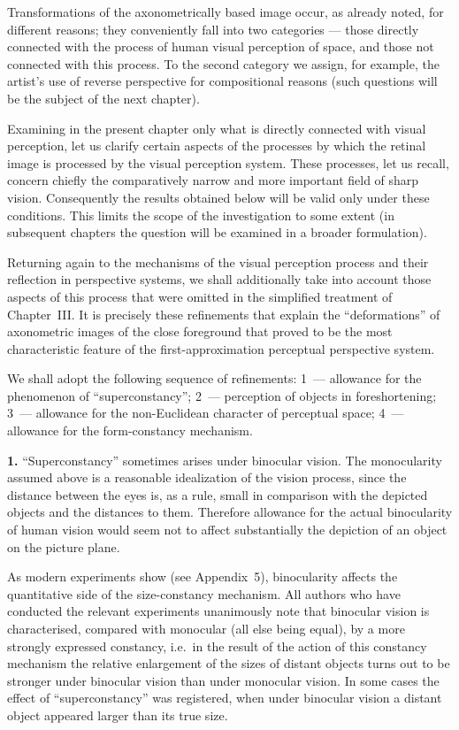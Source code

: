 Transformations of the axonometrically based image occur, as already noted, for
different reasons; they conveniently fall into two categories --- those directly
connected with the process of human visual perception of space, and those not
connected with this process.  To the second category we assign, for example, the
artist's use of reverse perspective for compositional reasons (such questions will be
the subject of the next chapter).

Examining in the present chapter only what is directly connected with visual
perception, let us clarify certain aspects of the processes by which the retinal
image is processed by the visual perception system.  These processes, let us recall,
concern chiefly the comparatively narrow and more important field of sharp vision.
Consequently the results obtained below will be valid only under these conditions.
This limits the scope of the investigation to some extent (in subsequent chapters the
question will be examined in a broader formulation).

Returning again to the mechanisms of the visual perception process and their
reflection in perspective systems, we shall additionally take into account those
aspects of this process that were omitted in the simplified treatment of Chapter~III.
It is precisely these refinements that explain the ``deformations'' of axonometric
images of the close foreground that proved to be the most characteristic feature of
the first-approximation perceptual perspective system.

We shall adopt the following sequence of refinements: 1~--- allowance for the
phenomenon of ``superconstancy''; 2~--- perception of objects in foreshortening;
3~--- allowance for the non-Euclidean character of perceptual space; 4~--- allowance
for the form-constancy mechanism.

\medskip
\noindent\textbf{1.}\quad
``Superconstancy'' sometimes arises under binocular vision.  The monocularity assumed
above is a reasonable idealization of the vision process, since the distance between
the eyes is, as a rule, small in comparison with the depicted objects and the
distances to them.  Therefore allowance for the actual binocularity of human vision
would seem not to affect substantially the depiction of an object on the picture
plane.


As modern experiments show (see Appendix~5), binocularity affects the quantitative
side of the size-constancy mechanism.  All authors who have conducted the relevant
experiments unanimously note that binocular vision is characterised, compared with
monocular (all else being equal), by a more strongly expressed constancy, i.e.\ in
the result of the action of this constancy mechanism the relative enlargement of the
sizes of distant objects turns out to be stronger under binocular vision than under
monocular vision.  In some cases the effect of ``superconstancy'' was registered,
when under binocular vision a distant object appeared larger than its true size.

